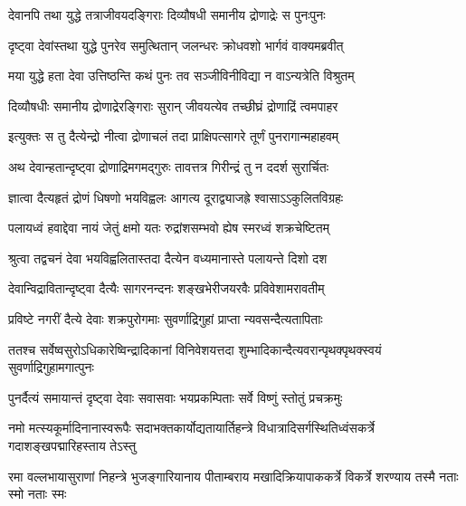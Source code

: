 \twolineshloka
{देवानपि तथा युद्धे तत्राजीवयदङ्गिराः}
{दिव्यौषधी समानीय द्रोणाद्रेः स पुनःपुनः} %

\twolineshloka
{दृष्ट्वा देवांस्तथा युद्धे पुनरेव समुत्थितान्}
{जलन्धरः क्रोधवशो भार्गवं वाक्यमब्रवीत्} %


\twolineshloka
{मया युद्धे हता देवा उत्तिष्ठन्ति कथं पुनः}
{तव सञ्जीविनीविद्या न वाऽन्यत्रेति विश्रुतम्} %


\twolineshloka
{दिव्यौषधीः समानीय द्रोणाद्रेरङ्गिराः सुरान्}
{जीवयत्येव तच्छीघ्रं द्रोणाद्रिं त्वमपाहर} %


\twolineshloka
{इत्युक्तः स तु दैत्येन्द्रो नीत्वा द्रोणाचलं तदा}
{प्राक्षिपत्सागरे तूर्णं पुनरागान्महाहवम्} %

\twolineshloka
{अथ देवान्हतान्दृष्ट्वा द्रोणाद्रिमगमद्गुरुः}
{तावत्तत्र गिरीन्द्रं तु न ददर्श सुरार्चितः} %

\twolineshloka
{ज्ञात्वा दैत्यहृतं द्रोणं धिषणो भयविह्वलः}
{आगत्य दूराद्व्याजह्रे श्वासाऽऽकुलितविग्रहः} %

\twolineshloka
{पलायध्वं हवाद्देवा नायं जेतुं क्षमो यतः}
{रुद्रांशसम्भवो ह्येष स्मरध्वं शक्रचेष्टितम्} %

\twolineshloka
{श्रुत्वा तद्वचनं देवा भयविह्वलितास्तदा}
{दैत्येन वध्यमानास्ते पलायन्ते दिशो दश} %

\twolineshloka
{देवान्विद्रावितान्दृष्ट्वा दैत्यैः सागरनन्दनः}
{शङ्खभेरीजयरवैः प्रविवेशामरावतीम्} %

\twolineshloka
{प्रविष्टे नगरीं दैत्ये देवाः शक्रपुरोगमाः}
{सुवर्णाद्रिगुहां प्राप्ता न्यवसन्दैत्यतापिताः} %

\twolineshloka
{ततश्च सर्वेष्वसुरोऽधिकारेष्विन्द्रादिकानां विनिवेशयत्तदा}
{शुम्भादिकान्दैत्यवरान्पृथक्पृथक्स्वयं सुवर्णाद्रिगुहामगात्पुनः} %





\twolineshloka
{पुनर्दैत्यं समायान्तं दृष्ट्वा देवाः सवासवाः}
{भयप्रकम्पिताः सर्वे विष्णुं स्तोतुं प्रचक्रमुः} %

\uvacha{[देवा ऊचुः]}

\fourlineindentedshloka
{नमो मत्स्यकूर्मादिनानास्वरूपैः}
{सदाभक्तकार्योद्यतायार्तिहन्त्रे}
{विधात्रादिसर्गस्थितिध्वंसकर्त्रे}
{गदाशङ्खपद्मारिहस्ताय तेऽस्तु} %

\fourlineindentedshloka
{रमा वल्लभायासुराणां निहन्त्रे}
{भुजङ्गारियानाय पीताम्बराय}
{मखादिक्रियापाककर्त्रे विकर्त्रे}
{शरण्याय तस्मै नताः स्मो नताः स्मः} %

